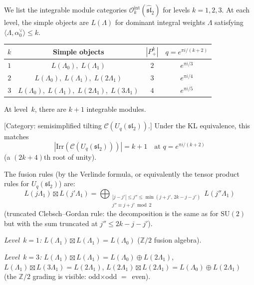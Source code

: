 \begin{example}\label{ex:integrable-low-levels}
We list the integrable module categories
$\mathcal{O}_k^{\mathrm{int}}(\widehat{\mathfrak{sl}}_2)$
for levels $k = 1, 2, 3$.  At each level, the simple objects are
$L(\Lambda)$ for dominant integral weights $\Lambda$ satisfying
$\langle \Lambda, \alpha_0^\vee \rangle \leq k$.
\begin{center}
\begin{tabular}{cccc}
$k$ & Simple objects & $|P^k_+|$ & $q = e^{\pi i/(k+2)}$ \\
\hline
$1$ & $L(\Lambda_0),\; L(\Lambda_1)$ & $2$ & $e^{\pi i/3}$ \\
$2$ & $L(\Lambda_0),\; L(\Lambda_1),\; L(2\Lambda_1)$ & $3$ &
  $e^{\pi i/4}$ \\
$3$ & $L(\Lambda_0),\; L(\Lambda_1),\; L(2\Lambda_1),\;
  L(3\Lambda_1)$ & $4$ & $e^{\pi i/5}$
\end{tabular}
\end{center}
At level~$k$, there are $k+1$ integrable modules.

\smallskip
\textup{[Category: semisimplified tilting
$\mathcal{C}(U_q(\mathfrak{sl}_2))$.]}
Under the KL equivalence, this matches
\[
|\mathrm{Irr}(\mathcal{C}(U_q(\mathfrak{sl}_2)))| = k+1
\quad\text{at } q = e^{\pi i/(k+2)}
\]
(a $(2k{+}4)$th root of unity).

The fusion rules (by the Verlinde formula, or equivalently the
tensor product rules for $U_q(\mathfrak{sl}_2)$) are:
\[
L(j\Lambda_1) \boxtimes L(j'\Lambda_1)
= \bigoplus_{\substack{|j - j'| \leq j'' \leq
   \min(j+j',\, 2k-j-j') \\ j'' \equiv j + j' \bmod 2}}
  L(j''\Lambda_1)
\]
(truncated Clebsch--Gordan rule: the decomposition is the same
as for $\mathrm{SU}(2)$ but with the sum truncated at $j'' \leq 2k - j - j'$).

\emph{Level~$k = 1$:}
$L(\Lambda_1) \boxtimes L(\Lambda_1) = L(\Lambda_0)$
($\mathbb{Z}/2$ fusion algebra).

\emph{Level~$k = 3$:}
$L(\Lambda_1) \boxtimes L(\Lambda_1)
= L(\Lambda_0) \oplus L(2\Lambda_1)$,
$L(\Lambda_1) \boxtimes L(3\Lambda_1) = L(2\Lambda_1)$,
$L(2\Lambda_1) \boxtimes L(2\Lambda_1) = L(\Lambda_0) \oplus
L(2\Lambda_1)$ (the $\mathbb{Z}/2$ grading is visible: odd$\times$odd
$=$~even).
\end{example}

